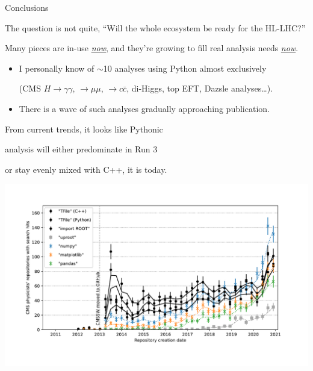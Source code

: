 \documentclass[aspectratio=169]{beamer}
\begin{document}
\begin{frame}{Conclusions}
\vspace{0.5 cm}
\large

The question is not quite, ``Will the whole ecosystem be ready for the HL-LHC?''

\vspace{0.25 cm}
Many pieces are in-use \underline{\it now}, and they're growing to fill real analysis needs \underline{\it now}.

\vspace{0.25 cm}
\begin{itemize}\setlength{\itemsep}{0.25 cm}
\item I personally know of $\sim$10 analyses using Python almost exclusively

(CMS $H \to \gamma\gamma$, $\to \mu\mu$, $\to c\bar{c}$, di-Higgs, top EFT, Dazsle analyses\ldots).

\item There is a wave of such analyses gradually approaching publication.
\end{itemize}

\vspace{0.6 cm}
From current trends, it looks like Pythonic

analysis will either predominate in Run 3

or stay evenly mixed with C++, it is today.

\vspace{-2.5 cm}
\hfill \mbox{\includegraphics[width=0.55\linewidth]{lhlhc-github-overlay-lin.pdf}\hspace{-1 cm}}

\vspace{-0.5 cm}
\end{frame}
\end{document}
